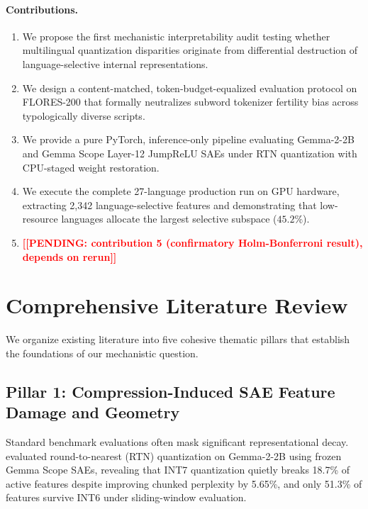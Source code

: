 \documentclass[11pt]{article}
\newcommand{\TODO}[1]{\textbf{\textcolor{red}{[[#1]]}}}
\begin{document}
\paragraph{Contributions.}
\begin{enumerate}
    \item We propose the first mechanistic interpretability audit testing whether multilingual quantization disparities originate from differential destruction of language-selective internal representations.
    \item We design a content-matched, token-budget-equalized evaluation protocol on FLORES-200 that formally neutralizes subword tokenizer fertility bias across typologically diverse scripts.
    \item We provide a pure PyTorch, inference-only pipeline evaluating Gemma-2-2B and Gemma Scope Layer-12 JumpReLU SAEs under RTN quantization with CPU-staged weight restoration.
    \item We execute the complete 27-language production run on GPU hardware, extracting 2,342 language-selective features and demonstrating that low-resource languages allocate the largest selective subspace ($45.2\%$).
    \item \TODO{PENDING: contribution 5 (confirmatory Holm-Bonferroni result), depends on rerun}
\end{enumerate}

\section{Comprehensive Literature Review}
We organize existing literature into five cohesive thematic pillars that establish the foundations of our mechanistic question.

\subsection{Pillar 1: Compression-Induced SAE Feature Damage and Geometry}
Standard benchmark evaluations often mask significant representational decay. \citet{duan2026perplexity} evaluated round-to-nearest (RTN) quantization on Gemma-2-2B using frozen Gemma Scope SAEs, revealing that INT7 quantization quietly breaks 18.7\% of active features despite improving chunked perplexity by 5.65\%, and only 51.3\% of features survive INT6 under sliding-window evaluation. 
\end{document}
